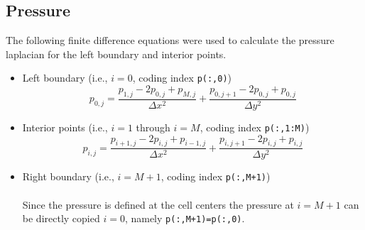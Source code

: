 \subsection{Pressure}
The following finite difference equations were used to calculate the
pressure laplacian for the left boundary and interior points. 

\begin{itemize}
    \item Left boundary (i.e., $i=0$, coding index \texttt{p(:,0)})
        \begin{equation}
            p_{0,j} =   \frac{
                            p_{1,j} - 2p_{0,j} + p_{M,j}
                            }{\Delta x^{2}}
                            +
                        \frac{
                            p_{0,j+1} - 2p_{0,j} + p_{0,j}
                            }{\Delta y^{2}}
        \end{equation}
    \item Interior points (i.e., $i=1$ through $i=M$, coding index
        \texttt{p(:,1:M)})
        \begin{equation}
            p_{i,j} =   \frac{
                            p_{i+1,j} - 2p_{i,j} + p_{i-1,j}
                            }{\Delta x^{2}}
                            +
                        \frac{
                            p_{i,j+1} - 2p_{i,j} + p_{i,j}
                            }{\Delta y^{2}}
        \end{equation}
    \item Right boundary (i.e., $i=M+1$, coding index \texttt{p(:,M+1)}) \\
        \\
        Since the pressure is defined at the cell centers the pressure at 
        $i=M+1$ can be directly copied $i=0$, namely
        \texttt{p(:,M+1)=p(:,0)}.
\end{itemize}
            
